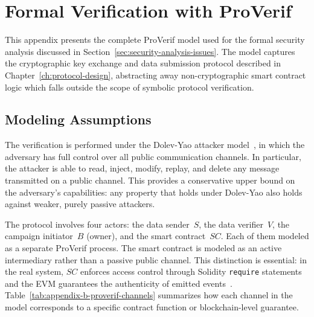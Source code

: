 \chapter{Formal Verification with ProVerif}\label{ch:appendix-b-proverif-v1-honest}

This appendix presents the complete ProVerif model used for the formal security analysis discussed in Section~\ref{sec:security-analysis-issues}.
The model captures the cryptographic key exchange and data submission protocol described in Chapter~\ref{ch:protocol-design},
abstracting away non-cryptographic smart contract logic which falls outside the scope of symbolic protocol verification.

\section{Modeling Assumptions}\label{sec:appendix-b-proverif-v1-honest-assumptions}
The verification is performed under the Dolev-Yao attacker model~\cite{dolev1983security}, in which the adversary has full control over all public communication channels.
In particular, the attacker is able to read, inject, modify, replay, and delete any message transmitted on a public channel.
This provides a conservative upper bound on the adversary's capabilities: any property that holds under Dolev-Yao also holds against weaker, purely passive attackers.

The protocol involves four actors: the data sender~$S$, the data verifier~$V$, the campaign initiator~$B$ (owner), and the smart contract~$SC$.
Each of them modeled as a separate ProVerif process.
The smart contract is modeled as an active intermediary rather than a passive public channel.
This distinction is essential: in the real system, $SC$ enforces access control through Solidity \texttt{require} statements and the EVM guarantees the authenticity of emitted events~\cite{ethereum}.
Table~\ref{tab:appendix-b-proverif-channels} summarizes how each channel in the model corresponds to a specific contract function or blockchain-level guarantee.

